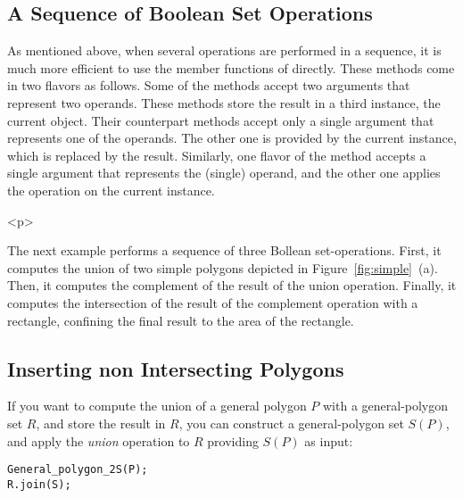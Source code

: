 \subsection{A Sequence of Boolean Set Operations}
\label{bso_ssec:sequence}
As mentioned above, when several operations are performed in a 
sequence, it is much more efficient to use the member functions of
 directly.
These methods come in two flavors as follows. Some of the methods accept two
arguments that represent two operands. These methods store the result
in a third instance, the current object. Their counterpart methods
accept only a single argument that represents one of the operands.
The other one is provided by the current instance, which is replaced by
the result. Similarly, one flavor of the  method
accepts a single argument that represents the (single) operand, and the 
other one applies the operation on the current instance.

\begin{ccHtmlOnly}<p>\end{ccHtmlOnly}
The next example performs a sequence of three Bollean set-operations.
First, it computes the union of two simple polygons depicted in
Figure~\ref{fig:simple}~(a). Then, it computes the complement of the result
of the union operation. Finally, it computes the intersection of the result
of the complement operation with a rectangle, confining the final result to 
the area of the rectangle.


\subsection{Inserting non Intersecting Polygons}
\label{bso_ssec:insert}
If you want to compute the union of a general polygon $P$ with a
general-polygon set $R$, and store the result in $R$, you can construct
a general-polygon set $S(P)$, and apply the {\em union} operation to
$R$ providing $S(P)$ as input:

\begin{alltt}
General_polygon_2 S(P);
R.join(S);
\end{alltt}

